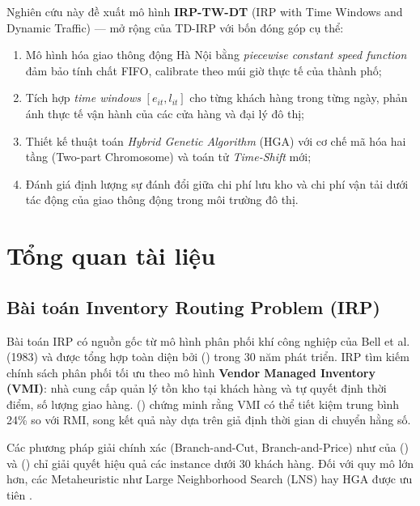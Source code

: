 \documentclass[12pt,a4paper]{article}
\newcommand{\boldterm}[1]{\textbf{\color{primary}#1}}
\newcommand{\citealias}[1]{\citeauthor{#1} (\citeyear{#1})}
\begin{document}
Nghiên cứu này đề xuất mô hình \boldterm{IRP-TW-DT} (IRP with Time Windows and Dynamic
Traffic) --- mở rộng của TD-IRP với bốn đóng góp cụ thể:

\begin{enumerate}[leftmargin=*, label=(\arabic*)]
  \item Mô hình hóa giao thông động Hà Nội bằng \textit{piecewise constant speed function}
        đảm bảo tính chất FIFO, calibrate theo múi giờ thực tế của thành phố;
  \item Tích hợp \textit{time windows} $[e_{it}, l_{it}]$ cho từng khách hàng trong
        từng ngày, phản ánh thực tế vận hành của các cửa hàng và đại lý đô thị;
  \item Thiết kế thuật toán \textit{Hybrid Genetic Algorithm} (HGA) với cơ chế mã hóa
        hai tầng (Two-part Chromosome) và toán tử \textit{Time-Shift} mới;
  \item Đánh giá định lượng sự đánh đổi giữa chi phí lưu kho và chi phí vận tải dưới
        tác động của giao thông động trong môi trường đô thị.
\end{enumerate}

\section{Tổng quan tài liệu}

\subsection{Bài toán Inventory Routing Problem (IRP)}

Bài toán IRP có nguồn gốc từ mô hình phân phối khí công nghiệp của Bell et al. (1983)
và được tổng hợp toàn diện bởi \citealias{coelho2014thirty} trong 30 năm phát triển.
IRP tìm kiếm chính sách phân phối tối ưu theo mô hình
\boldterm{Vendor Managed Inventory (VMI)}: nhà cung cấp quản lý tồn kho tại khách hàng
và tự quyết định thời điểm, số lượng giao hàng. \citealias{archetti2016vmi} chứng minh
rằng VMI có thể tiết kiệm trung bình 24\% so với RMI, song kết quả này dựa trên giả
định thời gian di chuyển hằng số.

Các phương pháp giải chính xác (Branch-and-Cut, Branch-and-Price) như của
\citealias{archetti2007branch} và \citealias{desaulniers2016branch} chỉ giải quyết
hiệu quả các instance dưới 30 khách hàng. Đối với quy mô lớn hơn, các Metaheuristic
như Large Neighborhood Search (LNS) hay HGA được ưu tiên
\citep{bouvier2024continent, adulyasak2014branch}.
\end{document}
